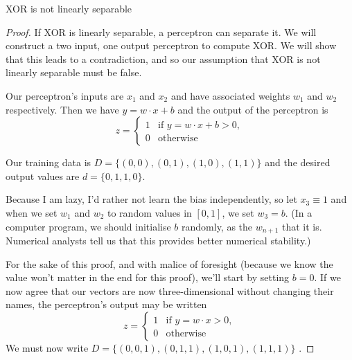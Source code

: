\documentclass[12 pt]{report}
\begin{document}
\centerline{\Large XOR is not linearly separable}
\bigskip


\begin{proof}

  If XOR is linearly separable, a perceptron can separate it.
  We will construct a two input, one output perceptron to compute XOR.
  We will show that this leads to a contradiction, and so our
  assumption that XOR is not linearly separable must be false.

  Our perceptron's inputs are $x_1$ and $x_2$ and have associated
  weights $w_1$ and $w_2$ respectively.  Then we have $y=w\cdot x + b$
  and the output of the perceptron is
  \begin{displaymath}
    z = \begin{cases}
      1 & \mbox{if } y = w\cdot x + b > 0, \\
      0 & \mbox{otherwise}
    \end{cases}
  \end{displaymath}

  Our training data is $D=\{ (0, 0), (0, 1), (1, 0), (1, 1) \}$ and the
  desired output values are $d=\{0, 1, 1, 0\}$.

  Because I am lazy, I'd rather not learn the bias independently, so
  let $x_3\equiv 1$ and when we set $w_1$ and $w_2$ to random values
  in $[0,1]$, we set $w_3=b$.  (In a computer program, we should
  initialise $b$ randomly, as the $w_{n+1}$ that it is.  Numerical
  analysts tell us that this provides better numerical stability.)

  For the sake of this proof, and with malice of foresight (because we
  know the value won't matter in the end for this proof), we'll start
  by setting $b=0$.  If we now agree that our vectors are now
  three-dimensional without changing their names, the perceptron's
  output may be written
  \begin{equation}
    \label{z}
    z = \begin{cases}
      1 & \mbox{if } y = w\cdot x > 0, \\
      0 & \mbox{otherwise}
    \end{cases}
  \end{equation}
  We must now write $D=\{ (0, 0, 1), (0, 1, 1), (1, 0, 1), (1, 1, 1) \}$ .


\end{proof}
\end{document}
